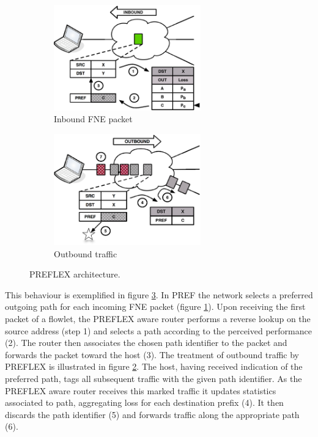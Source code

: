 \begin{figure}
    \begin{subfigure}[b]{0.5\textwidth}
        \centering
        \includegraphics[width=2.5in]{figures/preflex/preflex1}
        \caption{Inbound \acs{FNE} packet}
        \label{fig:preflexin}
    \end{subfigure}%
    \begin{subfigure}[b]{0.5\textwidth}
        \centering
        \includegraphics[width=2.5in]{figures/preflex/preflex2}
        \caption{Outbound traffic}
        \label{fig:preflexout}
    \end{subfigure}
    \caption{\acs{PREFLEX} architecture.}
    \label{fig:preflex}
\end{figure}

This behaviour is exemplified in figure \ref{fig:preflex}.  
In \ac{PREF} the network selects a preferred outgoing path for each incoming \ac{FNE} packet (figure \ref{fig:preflexin}). 
Upon receiving the first packet of a flowlet, the \ac{PREFLEX} aware router performs a reverse lookup on the source address (step 1) and selects a path according to the perceived performance (2). 
The router then associates the chosen path identifier to the packet and forwards the packet toward the host (3).
The treatment of outbound traffic by \ac{PREFLEX} is illustrated in figure \ref{fig:preflexout}. 
The host, having received indication of the preferred path, tags all subsequent traffic with the given path identifier. 
As the \ac{PREFLEX} aware router receives this marked traffic it updates statistics associated to path, aggregating loss for each destination prefix (4). 
It then discards the path identifier (5) and forwards traffic along the appropriate path (6). 

